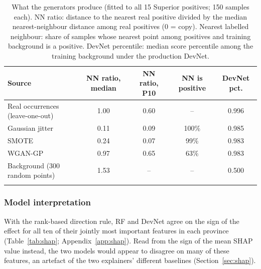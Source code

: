 \documentclass[pdflatex,sn-apa]{sn-jnl}
\begin{document}
\begin{table}[t]
\caption{What the generators produce (fitted to all 15 Superior positives; 150 samples each). NN ratio: distance to the nearest real positive divided by the median nearest-neighbour distance among real positives (0 = copy). Nearest labelled neighbour: share of samples whose nearest point among positives and training background is a positive. DevNet percentile: median score percentile among the training background under the production DevNet.}\label{tab:aug-diag}
\footnotesize
\setlength{\tabcolsep}{2.5pt}
\begin{tabular*}{\textwidth}{@{\extracolsep\fill}lcccc}
\toprule
Source & NN ratio, median & NN ratio, P10 & NN is positive & DevNet pct. \\
\midrule
Real occurrences (leave-one-out) & 1.00 & 0.60 & -- & 0.996 \\
Gaussian jitter & 0.11 & 0.09 & 100\% & 0.985 \\
SMOTE & 0.24 & 0.07 & 99\% & 0.983 \\
WGAN-GP & 0.97 & 0.65 & 63\% & 0.983 \\
Background (300 random points) & 1.53 & -- & -- & 0.500 \\
\botrule
\end{tabular*}
\end{table}

\subsubsection{Model interpretation}\label{sec:res-shap}

With the rank-based direction rule, RF and DevNet agree on the sign of the effect for all ten of their jointly most important features in each province (Table~\ref{tab:shap}; Appendix~\ref{app:shap}). Read from the sign of the mean SHAP value instead, the two models would appear to disagree on many of these features, an artefact of the two explainers' different baselines (Section~\ref{sec:shap}).
\end{document}
